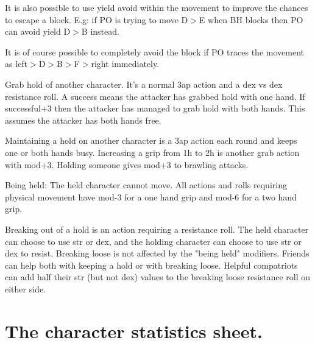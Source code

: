 It is also possible to use yield avoid within the movement to improve the chances to escape a block. E.g: if PO is trying to move D$>$E when BH blocks then PO can avoid yield D$>$B instead.

It is of course possible to completely avoid the block if PO traces the movement as left$>$D$>$B$>$F$>$right immediately.


 Grab hold of another character. It's a normal 3ap action and a dex vs dex resistance roll. A success means the attacker has grabbed hold with one hand. If successful+3 then the attacker has managed to grab hold with both hands. This assumes the attacker has both hands free.


 Maintaining a hold on another character is a 3ap action each round and keeps one or both hands busy. Increasing a grip from 1h to 2h is another grab action with mod+3.
Holding someone gives mod+3 to brawling attacks.

Being held: The held character cannot move. All actions and rolls requiring physical movement have mod-3 for a one hand grip and mod-6 for a two hand grip.


 Breaking out of a hold is an action requiring a resistance roll. The held character can choose to use str or dex, and the holding character can choose to use str or dex to resist. Breaking loose is not affected by the "being held" modifiers. Friends can help both with keeping a hold or with breaking loose. Helpful compatriots can add half their str (but not dex) values to the breaking loose resistance roll on either side.

\closeactionslist

















\section*{The character statistics sheet.}

